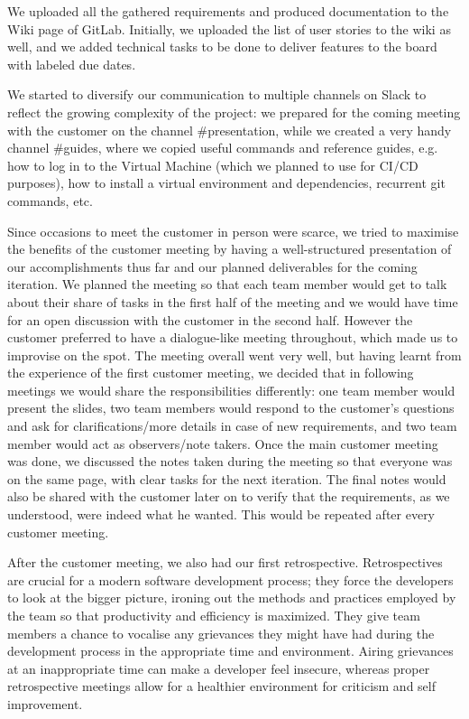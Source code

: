 \documentclass{l3proj}
\begin{document}
We uploaded all the gathered requirements and produced documentation to the Wiki page of GitLab.  Initially, we uploaded the list of user stories to the wiki as well, and we added technical tasks to be done to deliver features to the board with labeled due dates.

We started to diversify our communication to multiple channels on Slack to reflect the growing complexity of the project: we prepared for the coming meeting with the customer on the channel \#presentation, while we created a very handy channel \#guides, where we copied useful commands and reference guides, e.g. how to log in to the Virtual Machine (which we planned to use for CI/CD purposes), how to install a virtual environment and dependencies, recurrent git commands, etc.

Since occasions to meet the customer in person were scarce, we tried to maximise the benefits of the customer meeting by having a well-structured presentation of our accomplishments thus far and our planned deliverables for the coming iteration. We planned the meeting so that each team member would get to talk about their share of tasks in the first half of the meeting and we would have time for an open discussion with the customer in the second half. However the customer preferred to have a dialogue-like meeting throughout, which made us to improvise on the spot. The meeting overall went very well, but having learnt from the experience of the first customer meeting, we decided that in following meetings we would share the responsibilities differently: one team member would present the slides, two team members would respond to the customer’s questions and ask for clarifications/more details in case of new requirements, and two team member would act as observers/note takers. Once the main customer meeting was done, we discussed the notes taken during the meeting so that everyone was on the same page, with clear tasks for the next iteration. The final notes would also be shared with the customer later on to verify that the requirements, as we understood, were indeed what he wanted. This would be repeated after every customer meeting.

After the customer meeting, we also had our first retrospective. Retrospectives are crucial for a modern software development process; they force the developers to look at the bigger picture, ironing out the methods and practices employed by the team so that productivity and efficiency is maximized. They give team members a chance to vocalise any grievances they might have had during the development process in the appropriate time and environment. Airing grievances at an inappropriate time can make a developer feel insecure, whereas proper retrospective meetings allow for a healthier environment for criticism and self improvement.
\end{document}
